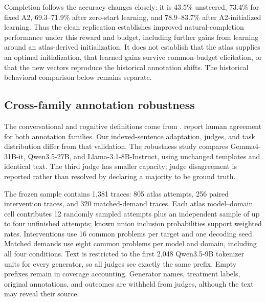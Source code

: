 Completion follows the accuracy changes closely: it is 43.5\% unsteered, 73.4\% for fixed A2, 69.3--71.9\% after zero-start learning, and 78.9--83.7\% after A2-initialized learning. Thus the clean replication establishes improved natural-completion performance under this reward and budget, including further gains from learning around an atlas-derived initialization. It does not establish that the atlas supplies an optimal initialization, that learned gains survive common-budget elicitation, or that the new vectors reproduce the historical annotation shifts. The historical behavioral comparison below remains separate.

\subsection{Cross-family annotation robustness}
\label{app:multijudge}
The conversational and cognitive definitions come from \citet{kim2026society,gandhi2025habits}. \citet{kim2026society} report human agreement for both annotation families. Our indexed-sentence adaptation, judges, and task distribution differ from that validation. The robustness study compares Gemma4-31B-it, Qwen3.5-27B, and Llama-3.1-8B-Instruct, using unchanged templates and identical text. The third judge has smaller capacity; judge disagreement is reported rather than resolved by declaring a majority to be ground truth.

The frozen sample contains 1,381 traces: 805 atlas attempts, 256 paired intervention traces, and 320 matched-demand traces. Each atlas model--domain cell contributes 12 randomly sampled attempts plus an independent sample of up to four unfinished attempts; known union inclusion probabilities support weighted rates. Interventions use 16 common problems per target and one decoding seed. Matched demands use eight common problems per model and domain, including all four conditions. Text is restricted to the first 2,048 Qwen3.5-9B tokenizer units for every generator, so all judges see exactly the same prefix. Empty prefixes remain in coverage accounting. Generator names, treatment labels, original annotations, and outcomes are withheld from judges, although the text may reveal their source.

